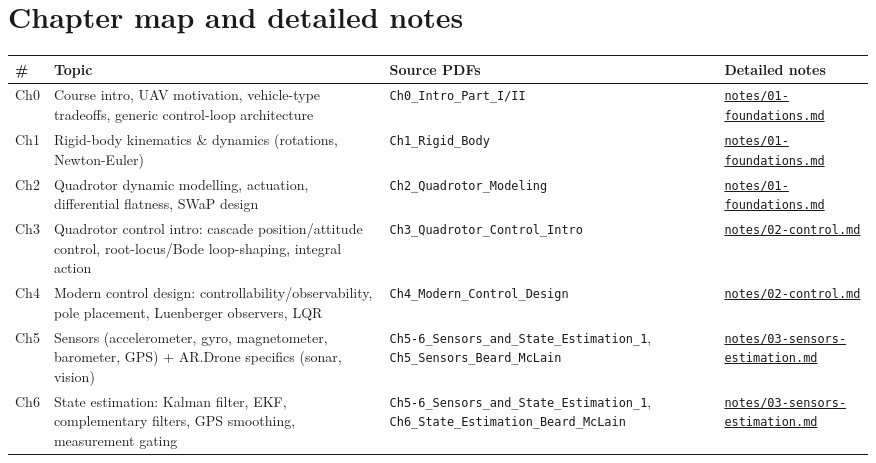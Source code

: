 \documentclass[11pt]{article}
\begin{document}
\section{Chapter map and detailed notes}

\begin{center}
\small
\setlength{\tabcolsep}{3pt}
\begin{longtable}{|p{1.32cm}|p{6.05cm}|p{4.16cm}|p{3.66cm}|}
\hline
\# & Topic & Source PDFs & Detailed notes \\
\hline
\endhead
Ch0 & Course intro, UAV motivation, vehicle-type tradeoffs, generic control-loop architecture & \texttt{Ch0\_\allowbreak{}Intro\_\allowbreak{}Part\_\allowbreak{}I/II} & \href{notes/01-foundations.pdf}{\texttt{notes/01-foundations.md}} \\
\hline
Ch1 & Rigid-body kinematics \& dynamics (rotations, Newton-Euler) & \texttt{Ch1\_\allowbreak{}Rigid\_\allowbreak{}Body} & \href{notes/01-foundations.pdf}{\texttt{notes/01-foundations.md}} \\
\hline
Ch2 & Quadrotor dynamic modelling, actuation, differential flatness, SWaP design & \texttt{Ch2\_\allowbreak{}Quadrotor\_\allowbreak{}Modeling} & \href{notes/01-foundations.pdf}{\texttt{notes/01-foundations.md}} \\
\hline
Ch3 & Quadrotor control intro: cascade position/attitude control, root-locus/Bode loop-shaping, integral action & \texttt{Ch3\_\allowbreak{}Quadrotor\_\allowbreak{}Control\_\allowbreak{}Intro} & \href{notes/02-control.pdf}{\texttt{notes/02-control.md}} \\
\hline
Ch4 & Modern control design: controllability/observability, pole placement, Luenberger observers, LQR & \texttt{Ch4\_\allowbreak{}Modern\_\allowbreak{}Control\_\allowbreak{}Design} & \href{notes/02-control.pdf}{\texttt{notes/02-control.md}} \\
\hline
Ch5 & Sensors (accelerometer, gyro, magnetometer, barometer, GPS) + AR.Drone specifics (sonar, vision) & \texttt{Ch5-6\_\allowbreak{}Sensors\_\allowbreak{}and\_\allowbreak{}State\_\allowbreak{}Estimation\_\allowbreak{}1}, \texttt{Ch5\_\allowbreak{}Sensors\_\allowbreak{}Beard\_\allowbreak{}McLain} & \href{notes/03-sensors-estimation.pdf}{\texttt{notes/03-sensors-estimation.md}} \\
\hline
Ch6 & State estimation: Kalman filter, EKF, complementary filters, GPS smoothing, measurement gating & \texttt{Ch5-6\_\allowbreak{}Sensors\_\allowbreak{}and\_\allowbreak{}State\_\allowbreak{}Estimation\_\allowbreak{}1}, \texttt{Ch6\_\allowbreak{}State\_\allowbreak{}Estimation\_\allowbreak{}Beard\_\allowbreak{}McLain} & \href{notes/03-sensors-estimation.pdf}{\texttt{notes/03-sensors-estimation.md}} \\

\end{longtable}
\end{center}
\end{document}
